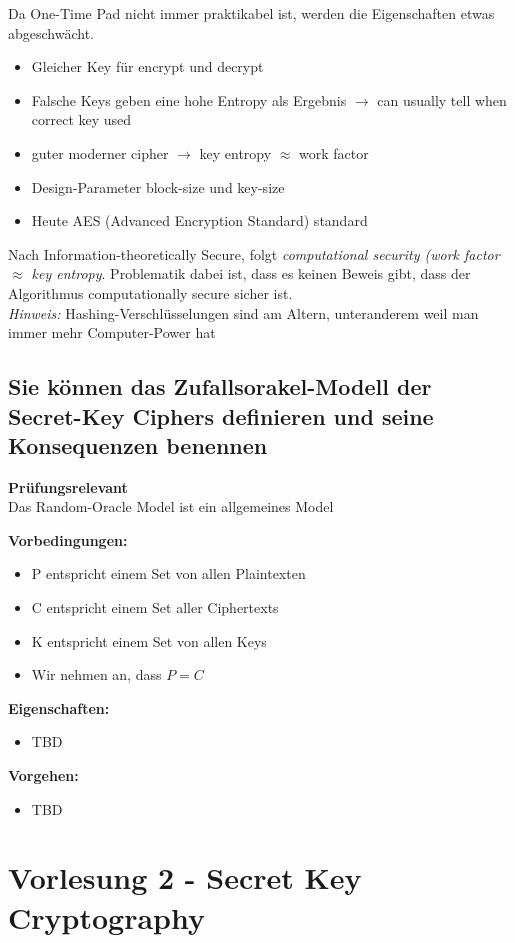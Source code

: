\documentclass{report}
\theoremstyle{definition}
\theoremstyle{example}
\begin{document}
Da One-Time Pad nicht immer praktikabel ist, werden die Eigenschaften etwas abgeschwächt. 
\begin{itemize}
	\item Gleicher Key für encrypt und decrypt
	\item Falsche Keys geben eine hohe Entropy als Ergebnis $\rightarrow$ can usually tell when correct key used
	\item guter moderner cipher $\rightarrow$ key entropy $\approx$ work factor
	\item Design-Parameter block-size und key-size
	\item Heute AES (Advanced Encryption Standard) standard
\end{itemize}

Nach Information-theoretically Secure, folgt \textit{computational security (work factor $\approx$ key entropy}. Problematik dabei ist, dass es keinen Beweis gibt, dass der Algorithmus computationally secure sicher ist.\\
\textit{Hinweis:} Hashing-Verschlüsselungen sind am Altern, unteranderem weil man immer mehr Computer-Power hat

\section{Sie können das Zufallsorakel-Modell der Secret-Key Ciphers definieren und seine Konsequenzen benennen}
\textbf{Prüfungsrelevant}\\
Das Random-Oracle Model ist ein allgemeines Model

\textbf{Vorbedingungen:}
\begin{itemize}
	\item P entspricht einem Set von allen Plaintexten
	\item C entspricht einem Set aller Ciphertexts
	\item K entspricht einem Set von allen Keys
	\item Wir nehmen an, dass $P=C$
\end{itemize}

\textbf{Eigenschaften:}
\begin{itemize}
	\item TBD
\end{itemize}

\textbf{Vorgehen:}
\begin{itemize}
	\item TBD
\end{itemize}

\chapter{Vorlesung 2 - Secret Key Cryptography}
\end{document}
